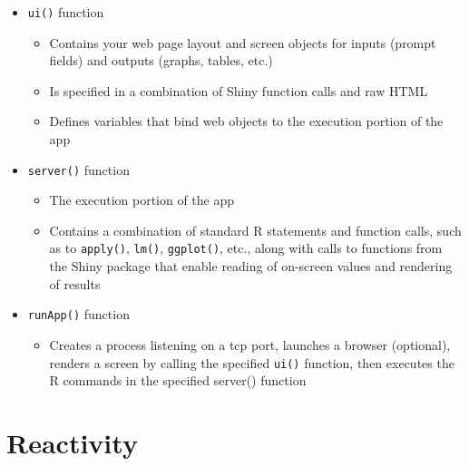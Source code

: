 \documentclass[10pt, letterpaper]{article}
\begin{document}
\begin{spacing}{1.0}
\begin{itemize}
    \item \texttt{ui()} function
    \begin{itemize}
        \item Contains your web page layout and screen objects for inputs (prompt fields) and outputs (graphs, tables, etc.)
        \item Is specified in a combination of Shiny function calls and raw HTML
        \item Defines variables that bind web objects to the execution portion of the app
    \end{itemize}
    \item \texttt{server()} function
    \begin{itemize}
        \item The execution portion of the app
        \item Contains a combination of standard R statements and function calls, such as to \texttt{apply()}, \texttt{lm()}, \texttt{ggplot()}, etc., along with calls to functions from the Shiny package that enable reading of on-screen values and rendering of results
    \end{itemize}
    \item \texttt{runApp()} function
    \begin{itemize}
        \item Creates a process listening on a tcp port, launches a browser (optional), renders a screen by calling the specified \texttt{ui()} function, then executes the R commands in the specified server() function
    \end{itemize}
\end{itemize}


\section{Reactivity}\label{sec:reactivity}


\end{spacing}
\end{document}
